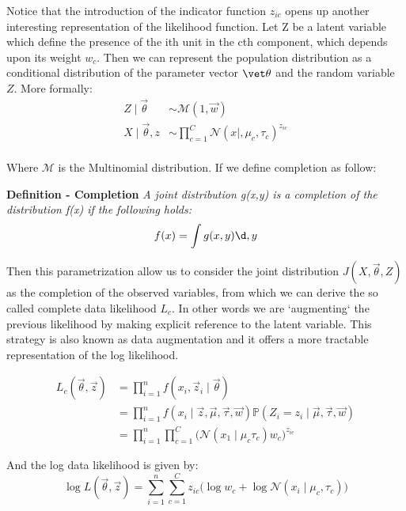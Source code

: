 \documentclass{article}
\begin{document}
Notice that the introduction of the indicator function $z_{ic}$ opens up another interesting representation of the likelihood function. Let Z be a latent variable which define the presence of the ith unit in the cth component, which depends upon its weight $w_c$. Then we can represent the population distribution as a conditional distribution of the parameter vector $\vet \theta$ and the random variable $Z$. More formally:
\begin{align*}
Z \mid \vec \theta & \sim \mathcal{M}(1, \vec w) \\
X \mid \vec \theta, z & \sim \prod_{c=1}^C \mathcal{N}(x \mid, \mu_c, \tau_c)^{z_{ic}}\\
\end{align*}

Where $\mathcal{M}$ is the Multinomial distribution. If we define completion as follow:

\textbf{Definition - Completion} \textit{
A joint distribution g(x,y) is a completion of the distribution f(x) if the following holds:}
\begin{equation}
f(x) = \int g(x,y) \d,y
\end{equation}

Then this parametrization allow us to consider the joint distribution $J(X, \vec \theta, Z)$ as the completion of the observed variables, from which we can derive the so called complete data likelihood $L_c$. In other words we are `augmenting` the previous likelihood by making explicit reference to the latent variable. This strategy is also known as data augmentation and it offers a more tractable representation of the log likelihood.

\begin{equation}
\begin{split}
L_c(\vec \theta, \vec z) &= \prod_{i=1}^n f(x_i, \vec z_i \mid \vec \theta) \\
&= \prod_{i=1}^n f(x_i \mid  \vec z, \vec \mu, \vec \tau, \vec w) \mathbb{P}(Z_i = z_i \mid \vec \mu, \vec \tau, \vec w) \\
&= \prod_{i=1}^n \prod_{c=1}^C \bigg( \mathcal{N}(x_1 \mid \mu_c \tau_c) w_c \bigg)^{z_{ic}}
\end{split}
\end{equation}

And the log data likelihood is given by:
\begin{equation}
\log L(\vec \theta, \vec z) = \sum_{i=1}^n \sum_{c=1}^C z_{ic}\bigg (\log w_c + \log \mathcal{N}(x_i \mid \mu_c, \tau_c) \bigg)
\end{equation}
\end{document}
